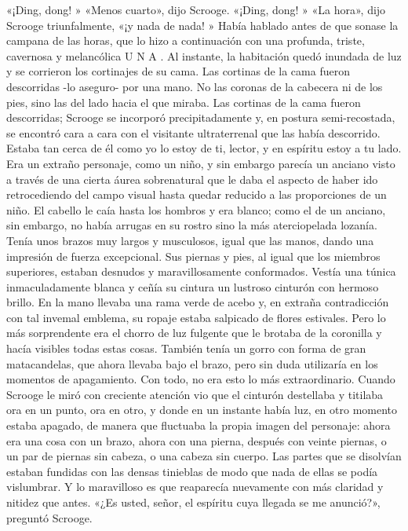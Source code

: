 \documentclass{novela}
\begin{document}
 «¡Ding, dong! »
 «Menos cuarto», dijo Scrooge.
 «¡Ding, dong! »
 «La hora», dijo Scrooge triunfalmente, «¡y nada de nada! »
 Había hablado antes de que sonase la campana de las horas, que lo hizo a continuación con una profunda, triste, cavernosa y melancólica U N A . Al instante, la habitación quedó inundada de luz y se corrieron los cortinajes de su cama.
 Las cortinas de la cama fueron descorridas -lo aseguro- por una mano. No las coronas de la cabecera ni de los pies, sino las del lado hacia el que miraba. Las cortinas de la cama fueron descorridas; Scrooge se incorporó precipitadamente y, en postura semi-recostada, se encontró cara a cara con el visitante ultraterrenal que las había descorrido. Estaba tan cerca de él como yo lo estoy de ti, lector, y en espíritu estoy a tu lado.
 Era un extraño personaje, como un niño, y sin embargo parecía un anciano visto a través de una cierta áurea sobrenatural que le daba el aspecto de haber ido retrocediendo del campo visual hasta quedar reducido a las proporciones de un niño. El cabello le caía hasta los hombros y era blanco; como el de un anciano, sin embargo, no había arrugas en su rostro sino la más aterciopelada lozanía. Tenía unos brazos muy largos y musculosos, igual que las manos, dando una impresión de fuerza excepcional. Sus piernas y pies, al igual que los miembros superiores, estaban desnudos y maravillosamente conformados. Vestía una túnica inmaculadamente blanca y ceñía su cintura un lustroso cinturón con hermoso brillo. En la mano llevaba una rama verde de acebo y, en extraña contradicción con tal invemal emblema, su ropaje estaba salpicado de flores estivales. Pero lo más sorprendente era el chorro de luz fulgente que le brotaba de la coronilla y hacía visibles todas estas cosas. También tenía un gorro con forma de gran matacandelas, que ahora llevaba bajo el brazo, pero sin duda utilizaría en los momentos de apagamiento.
 Con todo, no era esto lo más extraordinario. Cuando Scrooge le miró con creciente atención vio que el cinturón destellaba y titilaba ora en un punto, ora en otro, y donde en un instante había luz, en otro momento estaba apagado, de manera que fluctuaba la propia imagen del personaje: ahora era una cosa con un brazo, ahora con una pierna, después con veinte piernas, o un par de piernas sin cabeza, o una cabeza sin cuerpo. Las partes que se disolvían estaban fundidas con las densas tinieblas de modo que nada de ellas se podía vislumbrar. Y lo maravilloso es que reaparecía nuevamente con más claridad y nitidez que antes.
 «¿Es usted, señor, el espíritu cuya llegada se me anunció?», preguntó Scrooge.
\end{document}
